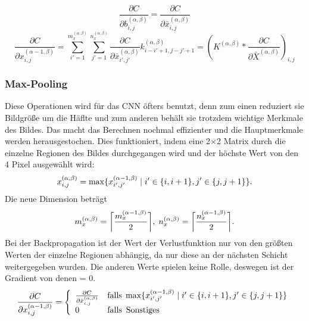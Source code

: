\documentclass[11pt]{article}
\begin{document}
\begin{equation}
    \frac{\partial C}{\partial b_{i,j}^{(\alpha,\beta)}} = \frac{\partial C}{\partial \bar{x}_{i,j}^{(\alpha,\beta)}}
\end{equation}
\begin{equation}
    \frac{\partial C}{\partial x_{i,j}^{(\alpha-1,\beta)}} = \sum_{i'=1}^{m_x^{(\alpha,\beta)}}\sum_{j'=1}^{n_x^{(\alpha,\beta)}} \frac{\partial C}{\partial \bar{x}_{i',j'}^{(\alpha,\beta)}} k_{i-i'+1,j-j'+1}^{(\alpha,\beta)}
    = {(K^{(\alpha,\beta)} \ast \frac{\partial C}{\partial \bar{X}^{(\alpha,\beta)}})}_{i,j}
\end{equation}

\subsubsection{Max-Pooling}
Diese Operationen wird für das CNN öfters benutzt, denn zum einen reduziert sie Bildgröße um die Häflte und zum anderen behält sie trotzdem wichtige
Merkmale des Bildes. Das macht das Berechnen nochmal effizienter und die Hauptmerkmale werden herausgestochen. Dies funktioniert, indem eine 2$\times$2 Matrix
durch die einzelne Regionen des Bildes durchgegangen wird und der höchste Wert von den 4 Pixel ausgewählt wird:
\begin{equation}
    x_{i,j}^{(\alpha,\beta)} = \max\{x_{i',j'}^{(\alpha-1,\beta)} \mkern5mu | \mkern5mu i' \in \{i,i+1\}, j' \in \{j,j+1\} \}.
\end{equation}
Die neue Dimension beträgt
\begin{equation}
    m_{x}^{(\alpha,\beta)} = \bigg\lceil \frac{m_{x}^{(\alpha-1,\beta)}}{2} \bigg\rceil, \mkern5mu
    n_{x}^{(\alpha,\beta)} = \bigg\lceil \frac{n_{x}^{(\alpha-1,\beta)}}{2} \bigg\rceil.
\end{equation}
Bei der Backpropagation ist der Wert der Verlustfunktion nur von den größten Werten der einzelne Regionen abhängig, da nur diese an der nächsten Schicht weitergegeben wurden.
Die anderen Werte spielen keine Rolle, deswegen ist der Gradient von denen = 0.
\begin{equation}
    \frac{\partial C}{\partial x_{i,j}^{(\alpha-1,\beta)}} =
    \left\{
    \begin{array}{ll}
		\frac{\partial C}{\partial \bar{x}_{i,j}^{(\alpha,\beta)}} & \mathrm{falls} \mkern5mu \max\{x_{i',j'}^{(\alpha-1,\beta)} \mkern5mu | \mkern5mu i' \in \{i,i+1\}, j' \in \{j,j+1\} \} \\
		0 & \mathrm{falls} \mkern9mu \mathrm{Sonstiges}
	\end{array}
    \right.
\end{equation}
\end{document}
